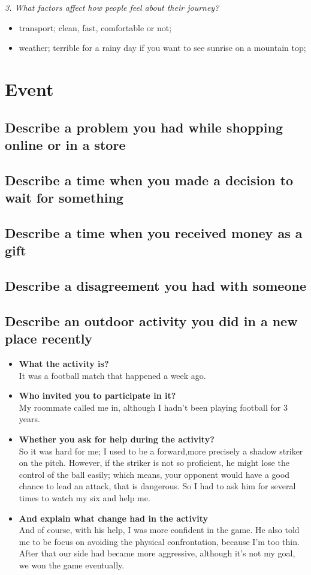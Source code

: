 \documentclass[conference]{IEEEtran}
\begin{document}
\textit{3. What factors affect how people feel about their journey?}
\begin{itemize}
    \item transport; clean, fast, comfortable or not;
    \item weather; terrible for a rainy day if you want to see sunrise on a mountain top;
\end{itemize}

\section{Event}
\subsection{Describe a problem you had while shopping online or in a store}
\subsection{Describe a time when you made a decision to wait for something}
\subsection{Describe a time when you received money as a gift}
\subsection{Describe a disagreement you had with someone}

\subsection{Describe an outdoor activity you did in a new place recently}
\begin{itemize}
    \item \textbf{What the activity is?}\\
    It was a football match that happened a week ago.
    \item \textbf{Who invited you to participate in it?}\\
    My roommate called me in, although I hadn't been playing football for 3 years. 
    \item \textbf{Whether you ask for help during the activity?}\\
    So it was hard for me;
    I used to be a forward,more precisely a shadow striker on the pitch.
    However, if the striker is not so proficient, he might lose the control of the ball easily;
    which means, your opponent would have a good chance to lead an attack, that is dangerous.
    So I had to ask him for several times to watch my six and help me.
    \item \textbf{And explain what change had in the activity}\\
    And of course, with his help, I was more confident in the game.
    He also told me to be focus on avoiding the physical confrontation, because I'm too thin.
    After that our side had became more aggressive, although it's not my goal, we won the game eventually.
\end{itemize}
\end{document}
